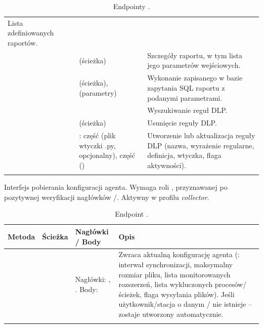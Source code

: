 \begin{longtable}{M{1.4cm} M{4.2cm} M{4.6cm} M{4.1cm}}
  Lista zdefiniowanych raportów. \\
 &  &  (ścieżka) &
  Szczegóły raportu, w tym lista jego parametrów wejściowych. \\
 &  &  (ścieżka),  (parametry) &
  Wykonanie zapisanego w bazie zapytania SQL raportu z podanymi parametrami. \\
 &  &  &
  Wyszukiwanie reguł DLP. \\
 &  &  (ścieżka) &
  Usunięcie reguły DLP. \\
 &  & : część  (plik wtyczki .py, opcjonalny), część  () &
  Utworzenie lub aktualizacja reguły DLP (nazwa, wyrażenie regularne, definicja, wtyczka, flaga aktywności). \\
\bottomrule
\caption{Endpointy .}
\end{longtable}
\endgroup


Interfejs pobierania konfiguracji agenta. Wymaga roli , przyznawanej po pozytywnej
weryfikacji nagłówków /. Aktywny w profilu \emph{collector}.

\begingroup\footnotesize
\begin{longtable}{M{1.4cm} M{2.8cm} M{5.2cm} M{5.0cm}}
\toprule
{}
\textbf{Metoda} & \textbf{Ścieżka} & \textbf{Nagłówki / Body} & \textbf{Opis} \\
\midrule
\endhead
{} &  &
  Nagłówki: , . Body:  &
  Zwraca aktualną konfigurację agenta (: interwał synchronizacji, maksymalny
  rozmiar pliku, lista monitorowanych rozszerzeń, lista wykluczonych procesów/ścieżek, flaga
  wysyłania plików). Jeśli użytkownik/stacja o danym / nie istnieje --
  zostaje utworzony automatycznie. \\
\bottomrule
\caption{Endpoint .}
\end{longtable}
\endgroup


